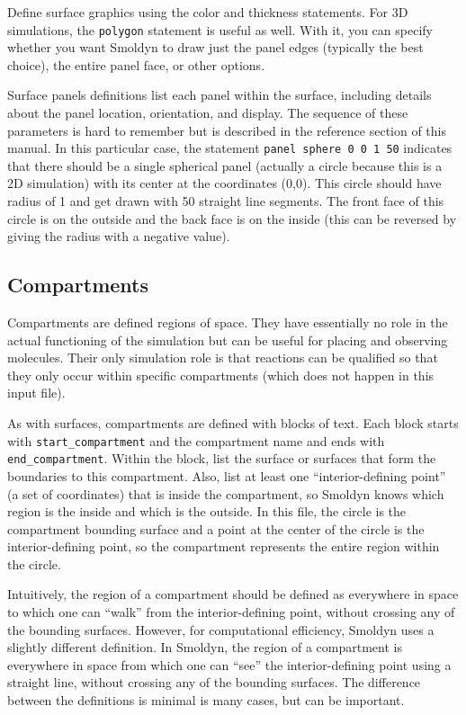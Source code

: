 \documentclass {book}
\newcommand {\ttt} {\texttt}
\begin{document}
Define surface graphics using the color and thickness statements. For 3D simulations, the  \ttt{polygon} statement is useful as well. With it, you can specify whether you want Smoldyn to draw just the panel edges (typically the best choice), the entire panel face, or other options.

Surface panels definitions list each panel within the surface, including details about the panel location, orientation, and display. The sequence of these parameters is hard to remember but is described in the reference section of this manual. In this particular case, the statement  \ttt{panel sphere 0 0 1 50} indicates that there should be a single spherical panel (actually a circle because this is a 2D simulation) with its center at the coordinates (0,0). This circle should have radius of 1 and get drawn with 50 straight line segments. The front face of this circle is on the outside and the back face is on the inside (this can be reversed by giving the radius with a negative value).

\subsection*{Compartments}

Compartments are defined regions of space. They have essentially no role in the actual functioning of the simulation but can be useful for placing and observing molecules. Their only simulation role is that reactions can be qualified so that they only occur within specific compartments (which does not happen in this input file).

As with surfaces, compartments are defined with blocks of text. Each block starts with  \ttt{start\_compartment} and the compartment name and ends with  \ttt{end\_compartment}. Within the block, list the surface or surfaces that form the boundaries to this compartment. Also, list at least one ``interior-defining point'' (a set of coordinates) that is inside the compartment, so Smoldyn knows which region is the inside and which is the outside. In this file, the circle is the compartment bounding surface and a point at the center of the circle is the interior-defining point, so the compartment represents the entire region within the circle.

Intuitively, the region of a compartment should be defined as everywhere in space to which one can ``walk'' from the interior-defining point, without crossing any of the bounding surfaces. However, for computational efficiency, Smoldyn uses a slightly different definition. In Smoldyn, the region of a compartment is everywhere in space from which one can ``see'' the interior-defining point using a straight line, without crossing any of the bounding surfaces. The difference between the definitions is minimal is many cases, but can be important.
\end{document}
